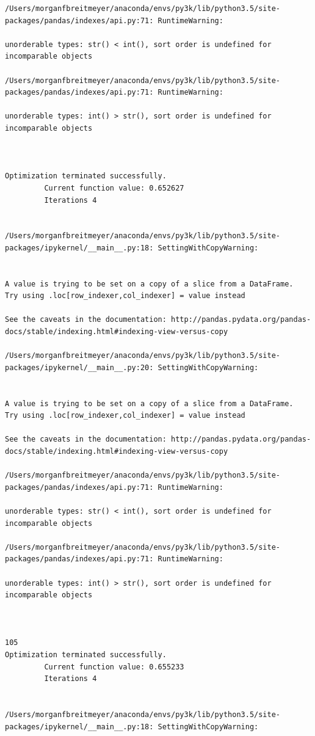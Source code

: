 \begin{lstlisting}
/Users/morganfbreitmeyer/anaconda/envs/py3k/lib/python3.5/site-packages/pandas/indexes/api.py:71: RuntimeWarning:

unorderable types: str() < int(), sort order is undefined for incomparable objects

/Users/morganfbreitmeyer/anaconda/envs/py3k/lib/python3.5/site-packages/pandas/indexes/api.py:71: RuntimeWarning:

unorderable types: int() > str(), sort order is undefined for incomparable objects



Optimization terminated successfully.
         Current function value: 0.652627
         Iterations 4


/Users/morganfbreitmeyer/anaconda/envs/py3k/lib/python3.5/site-packages/ipykernel/__main__.py:18: SettingWithCopyWarning:


A value is trying to be set on a copy of a slice from a DataFrame.
Try using .loc[row_indexer,col_indexer] = value instead

See the caveats in the documentation: http://pandas.pydata.org/pandas-docs/stable/indexing.html#indexing-view-versus-copy

/Users/morganfbreitmeyer/anaconda/envs/py3k/lib/python3.5/site-packages/ipykernel/__main__.py:20: SettingWithCopyWarning:


A value is trying to be set on a copy of a slice from a DataFrame.
Try using .loc[row_indexer,col_indexer] = value instead

See the caveats in the documentation: http://pandas.pydata.org/pandas-docs/stable/indexing.html#indexing-view-versus-copy

/Users/morganfbreitmeyer/anaconda/envs/py3k/lib/python3.5/site-packages/pandas/indexes/api.py:71: RuntimeWarning:

unorderable types: str() < int(), sort order is undefined for incomparable objects

/Users/morganfbreitmeyer/anaconda/envs/py3k/lib/python3.5/site-packages/pandas/indexes/api.py:71: RuntimeWarning:

unorderable types: int() > str(), sort order is undefined for incomparable objects



105
Optimization terminated successfully.
         Current function value: 0.655233
         Iterations 4


/Users/morganfbreitmeyer/anaconda/envs/py3k/lib/python3.5/site-packages/ipykernel/__main__.py:18: SettingWithCopyWarning:



\end{lstlisting}
